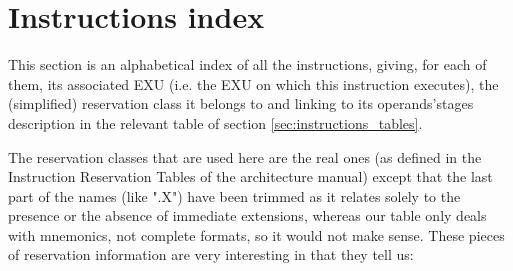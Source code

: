 \begin{landscape}
\begin{small}
\end{small}
\newpage
\end{landscape}
\section{Instructions index}
This section is an alphabetical index of all the instructions, giving, for each of them, its associated EXU (i.e. the EXU on which this instruction executes), the (simplified) reservation class it belongs to and linking to its operands'stages description in the relevant table of section \ref{sec:instructions_tables}.

The reservation classes that are used here are the real ones (as defined in the Instruction Reservation Tables of the architecture manual) except that the last part of the names (like ".X")  have been trimmed as it relates solely to the presence or the absence of immediate extensions, whereas our table only deals with mnemonics, not complete formats, so it would not make sense.
These pieces of reservation information are very interesting in that they tell us:\\

